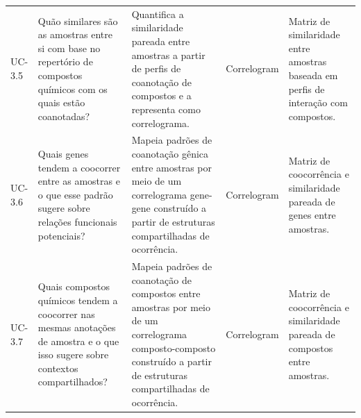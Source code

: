 \begin{landscape}
\begin{longtable}{>{\raggedright\arraybackslash}p{1.1cm} >{\raggedright\arraybackslash}p{5.0cm} >{\raggedright\arraybackslash}p{7.8cm} >{\raggedright\arraybackslash}p{4.2cm} >{\raggedright\arraybackslash}p{5.3cm}}
UC-3.5 & Quão similares são as amostras entre si com base no repertório de compostos químicos com os quais estão coanotadas? & Quantifica a similaridade pareada entre amostras a partir de perfis de coanotação de compostos e a representa como correlograma. & Correlogram & Matriz de similaridade entre amostras baseada em perfis de interação com compostos. \\
UC-3.6 & Quais genes tendem a coocorrer entre as amostras e o que esse padrão sugere sobre relações funcionais potenciais? & Mapeia padrões de coanotação gênica entre amostras por meio de um correlograma gene-gene construído a partir de estruturas compartilhadas de ocorrência. & Correlogram & Matriz de coocorrência e similaridade pareada de genes entre amostras. \\
UC-3.7 & Quais compostos químicos tendem a coocorrer nas mesmas anotações de amostra e o que isso sugere sobre contextos compartilhados? & Mapeia padrões de coanotação de compostos entre amostras por meio de um correlograma composto-composto construído a partir de estruturas compartilhadas de ocorrência. & Correlogram & Matriz de coocorrência e similaridade pareada de compostos entre amostras. \\
\end{longtable}
\end{landscape}
\clearpage

